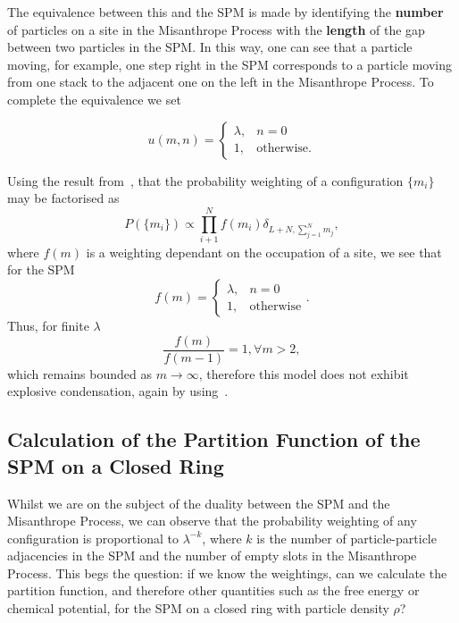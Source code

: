 The equivalence between this and the SPM is made by identifying the \textbf{number} of particles on a site in the Misanthrope Process with the \textbf{length} of the gap between two particles in the SPM. In this way, one can see that a particle
moving, for example, one step right in the SPM corresponds to a particle moving from one stack to the adjacent one on the left in the Misanthrope Process. To complete the equivalence we set


\[
  u(m, n) =
  \begin{cases}
                                   \lambda, & n=0 \\
                                   1, & \text{otherwise.} 
  \end{cases}
\]

Using the result from~\cite{evansWaclaw2014}, that the probability weighting of a configuration 
$\{m_i\}$ may be factorised as
\begin{equation}
 P(\{m_i\}) \propto \prod_{i+1}^N f(m_i) \delta_{L+N, \sum_{j=1}^N m_j},
\end{equation}
where $f(m)$ is a weighting dependant on the occupation of a site,  we see that for the SPM 
\begin{equation}
 f(m) = 
 \begin{cases}
 \lambda, & n=0 \\
 1, & \text{otherwise}
 \end{cases}.
\end{equation}
Thus, for finite $\lambda$ 
\begin{equation}
 \frac{f(m)}{f(m-1)} = 1, \forall m>2, 
\end{equation}
which remains bounded as $m \rightarrow \infty$, therefore this model does not exhibit explosive condensation, again by using~\cite{evansWaclaw2014}.

\subsection{Calculation of the Partition Function of the SPM on a Closed Ring} \label{sec:spmPartFn}

Whilst we are on the subject of the duality between the SPM and the Misanthrope Process, we
can observe that the probability weighting of any configuration is proportional to $\lambda^{-k}$,
where $k$ is the number of particle-particle adjacencies in the SPM and the number of empty slots
in the Misanthrope Process. This begs the question: if we know the weightings, can we calculate the
partition function, and therefore other quantities such as the free energy or chemical potential,
for the SPM on a closed ring with particle density $\rho$?

